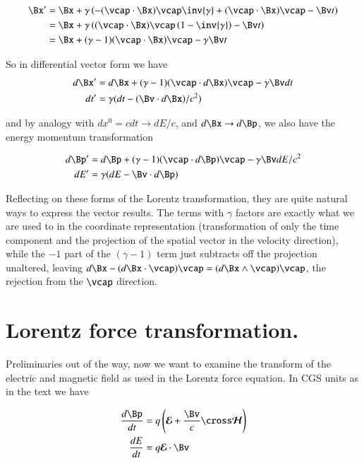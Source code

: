 \begin{align*}
\Bx' 
&= \Bx + \gamma \left( -(\vcap \cdot \Bx) \vcap \inv{\gamma} + (\vcap \cdot \Bx )\vcap - \Bv t \right) \\
&= \Bx + \gamma \left( (\vcap \cdot \Bx) \vcap \left(1-\inv{\gamma} \right) - \Bv t \right) \\
&= \Bx + (\gamma-1)(\vcap \cdot \Bx) \vcap - \gamma \Bv t \\
\end{align*}

So in differential vector form we have
\begin{align}\label{eqn:lorentzFboost:differentialSpaceTime}
d\Bx'
&= d\Bx + (\gamma-1)(\vcap \cdot d\Bx) \vcap - \gamma \Bv dt \\
dt' 
&= \gamma ( dt - (\Bv \cdot d\Bx )/c^2 )
\end{align}

and by analogy with $dx^0 = cdt \rightarrow dE/c$, and $d\Bx \rightarrow d\Bp$, we also have the energy momentum transformation 

\begin{align}\label{eqn:lorentzFboost:differentialEnergyMomentum}
d\Bp'
&= d\Bp + (\gamma-1)(\vcap \cdot d\Bp) \vcap - \gamma \Bv dE/c^2 \\
dE' 
&= \gamma ( dE - \Bv \cdot d\Bp )
\end{align}

Reflecting on these forms of the Lorentz transformation, they are quite
natural ways to express the vector results.  The terms with $\gamma$ factors
are exactly what we are used to in the coordinate representation (transformation
of only the time component and the projection of the spatial vector in the
velocity direction), while the $-1$ part of the $(\gamma-1)$ term just
subtracts off the projection unaltered, leaving
$d\Bx - (d\Bx \cdot \vcap) \vcap = (d\Bx \wedge \vcap) \vcap$, the rejection
from the $\vcap$ direction.

\section{Lorentz force transformation. }

Preliminaries out of the way, now we want to examine the transform of the electric and magnetic field as used in the Lorentz force equation.  In
CGS units as in the text we have

\begin{align}
\frac{d\Bp}{dt} &= q \left( \EE + \frac{\Bv}{c} \cross \HH \right) \\
\frac{dE}{dt} &= q \EE \cdot \Bv
\end{align}

